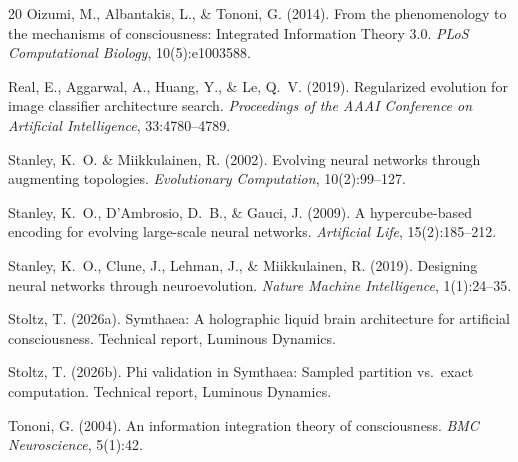 \documentclass[11pt,a4paper]{article}
\begin{document}
\begin{thebibliography}{20}
Oizumi, M., Albantakis, L., \& Tononi, G. (2014).
\newblock From the phenomenology to the mechanisms of consciousness: Integrated Information Theory 3.0.
\newblock \emph{PLoS Computational Biology}, 10(5):e1003588.

Real, E., Aggarwal, A., Huang, Y., \& Le, Q.~V. (2019).
\newblock Regularized evolution for image classifier architecture search.
\newblock \emph{Proceedings of the AAAI Conference on Artificial Intelligence}, 33:4780--4789.

Stanley, K.~O. \& Miikkulainen, R. (2002).
\newblock Evolving neural networks through augmenting topologies.
\newblock \emph{Evolutionary Computation}, 10(2):99--127.

Stanley, K.~O., D'Ambrosio, D.~B., \& Gauci, J. (2009).
\newblock A hypercube-based encoding for evolving large-scale neural networks.
\newblock \emph{Artificial Life}, 15(2):185--212.

Stanley, K.~O., Clune, J., Lehman, J., \& Miikkulainen, R. (2019).
\newblock Designing neural networks through neuroevolution.
\newblock \emph{Nature Machine Intelligence}, 1(1):24--35.

Stoltz, T. (2026a).
\newblock Symthaea: A holographic liquid brain architecture for artificial consciousness.
\newblock Technical report, Luminous Dynamics.

Stoltz, T. (2026b).
\newblock Phi validation in Symthaea: Sampled partition vs.\ exact computation.
\newblock Technical report, Luminous Dynamics.

Tononi, G. (2004).
\newblock An information integration theory of consciousness.
\newblock \emph{BMC Neuroscience}, 5(1):42.

\end{thebibliography}
\end{document}
